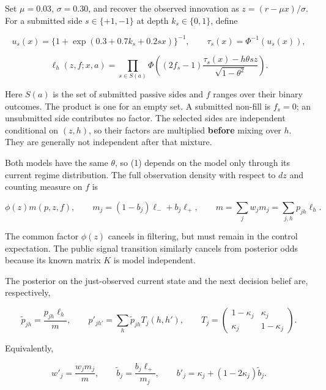 \documentclass[10pt,a4paper]{article}
\begin{document}
Set $\mu=0.03$, $\sigma=0.30$, and recover the observed innovation as
$z=(r-\mu x)/\sigma$. For a submitted side $s\in\{+1,-1\}$ at depth
$k_s\in\{0,1\}$, define

\begin{equation*}
u_s(x)=\{1+\exp(0.3+0.7k_s+0.2sx)\}^{-1},\qquad
\tau_s(x)=\Phi^{-1}(u_s(x)),
\end{equation*}

\begin{equation}
\ell_h(z,f;x,a)=
\prod_{s\in S(a)}
\Phi\!\left(
 (2f_s-1)\frac{\tau_s(x)-h\theta s z}{\sqrt{1-\theta^2}}
\right).
\tag{1}
\end{equation}

Here $S(a)$ is the set of submitted passive sides and $f$ ranges over their
binary outcomes. The product is one for an empty set. A submitted non-fill is
$f_s=0$; an unsubmitted side contributes no factor. The selected sides are
independent conditional on $(z,h)$, so their factors are multiplied \textbf{before}
mixing over $h$. They are generally not independent after that mixture.

Both models have the same $\theta$, so (1) depends on the model only through
its current regime distribution. The full observation density with respect to
$dz$ and counting measure on $f$ is

\begin{equation}
\phi(z)m(p,z,f),\qquad
m_j=(1-b_j)\ell_-+b_j\ell_+,\qquad
m=\sum_j w_jm_j=\sum_{j,h}p_{jh}\ell_h.
\tag{2}
\end{equation}

The common factor $\phi(z)$ cancels in filtering, but must remain in the
control expectation. The public signal transition similarly cancels from
posterior odds because its known matrix $K$ is model independent.

The posterior on the just-observed current state and the next decision belief
are, respectively,

\begin{equation}
\widetilde p_{jh}=\frac{p_{jh}\ell_h}{m},\qquad
p'_{jh'}=\sum_h\widetilde p_{jh}T_j(h,h'),\qquad
T_j=\begin{pmatrix}1-\kappa_j&\kappa_j\\
\kappa_j&1-\kappa_j\end{pmatrix}.
\tag{3}
\end{equation}

Equivalently,

\begin{equation}
w'_j=\frac{w_jm_j}{m},\qquad
\widetilde b_j=\frac{b_j\ell_+}{m_j},\qquad
b'_j=\kappa_j+(1-2\kappa_j)\widetilde b_j.
\tag{4}
\end{equation}
\end{document}
